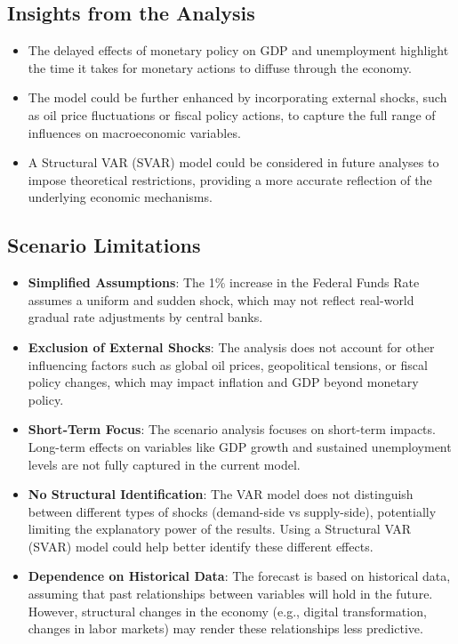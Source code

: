 \documentclass{article}
\begin{document}
\subsection{Insights from the Analysis}
\begin{itemize}
    \item The delayed effects of monetary policy on GDP and unemployment highlight the time it takes for monetary actions to diffuse through the economy.
    \item The model could be further enhanced by incorporating external shocks, such as oil price fluctuations or fiscal policy actions, to capture the full range of influences on macroeconomic variables.
    \item A Structural VAR (SVAR) model could be considered in future analyses to impose theoretical restrictions, providing a more accurate reflection of the underlying economic mechanisms.
\end{itemize}

\subsection{Scenario Limitations}
\begin{itemize}
    \item \textbf{Simplified Assumptions}: The 1\% increase in the Federal Funds Rate assumes a uniform and sudden shock, which may not reflect real-world gradual rate adjustments by central banks.
    \item \textbf{Exclusion of External Shocks}: The analysis does not account for other influencing factors such as global oil prices, geopolitical tensions, or fiscal policy changes, which may impact inflation and GDP beyond monetary policy.
    \item \textbf{Short-Term Focus}: The scenario analysis focuses on short-term impacts. Long-term effects on variables like GDP growth and sustained unemployment levels are not fully captured in the current model.
    \item \textbf{No Structural Identification}: The VAR model does not distinguish between different types of shocks (demand-side vs supply-side), potentially limiting the explanatory power of the results. Using a Structural VAR (SVAR) model could help better identify these different effects.
    \item \textbf{Dependence on Historical Data}: The forecast is based on historical data, assuming that past relationships between variables will hold in the future. However, structural changes in the economy (e.g., digital transformation, changes in labor markets) may render these relationships less predictive.
\end{itemize}
\end{document}
